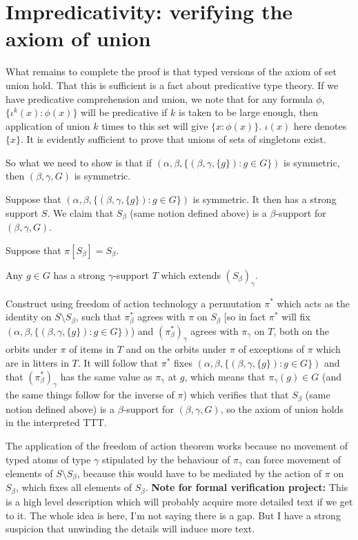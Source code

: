 \newpage
\section{Impredicativity:  verifying the axiom of union}

What remains to complete the proof is that typed versions of the axiom of set union hold.  That this is sufficient is a fact about predicative type theory.
If we have predicative comprehension and union, we note that for any formula $\phi$, $\{\iota^k(x):\phi(x)\}$ will be predicative if $k$ is taken to be large enough, then application of union $k$ times to this set will give $\{x:\phi(x)\}$.  $\iota(x)$ here denotes $\{x\}$.  It is evidently sufficient to prove that unions of sets of singletons exist.

So what we need to show is that if $(\alpha,\beta,\{(\beta,\gamma,\{g\}):g \in G\})$ is symmetric, then $(\beta,\gamma,G)$ is symmetric.

Suppose that $(\alpha,\beta,\{(\beta,\gamma,\{g\}):g \in G\})$ is symmetric.  It then has a strong support $S$.  We claim that $S_\beta$ (same notion defined above) is a $\beta$-support for $(\beta,\gamma,G)$.

Suppose that $\pi[S_\beta]=S_\beta$.

Any $g \in G$ has a strong $\gamma$-support $T$ which extends $(S_\beta)_\gamma$.

Construct using freedom of action technology a permutation $\pi^*$ which acts as the identity on $S \setminus S_\beta$, such that $\pi^*_\beta$ agrees with $\pi$ on $S_\beta$ [so in fact $\pi^*$ will fix $(\alpha,\beta,\{(\beta,\gamma,\{g\}):g \in G\})$) and $(\pi^*_\beta)_\gamma$ agrees with $\pi_\gamma$ on $T$, both on the orbits under $\pi$ of items in $T$ and on the orbits under $\pi$ of exceptions of $\pi$ which are in litters in $T$.  It will follow that $\pi^*$ fixes $(\alpha,\beta,\{(\beta,\gamma,\{g\}):g \in G\})$ and that $(\pi^*_\beta)_\gamma$ has the same value as $\pi_\gamma$ at $g$, which means that $\pi_\gamma(g) \in G$ (and the same things follow for the inverse of $\pi$) which verifies that that $S_\beta$ (same notion defined above) is a $\beta$-support for $(\beta,\gamma,G)$, so the axiom of union holds in the interpreted TTT.

The application of the freedom of action theorem works because no movement of typed atoms of type $\gamma$ stipulated by the behaviour of $\pi_\gamma$ can force
movement of elements of $S \setminus S_\beta$, because this would have to be mediated by the action of $\pi$ on $S_\beta$, which fixes all elements of $S_\beta$.
{\bf Note for formal verification project:}  This is a high level description which will probably acquire more detailed text if we get to it.  The whole idea is here, I'm not saying there is a gap.  But I have a strong suspicion that unwinding the details will induce more text.

